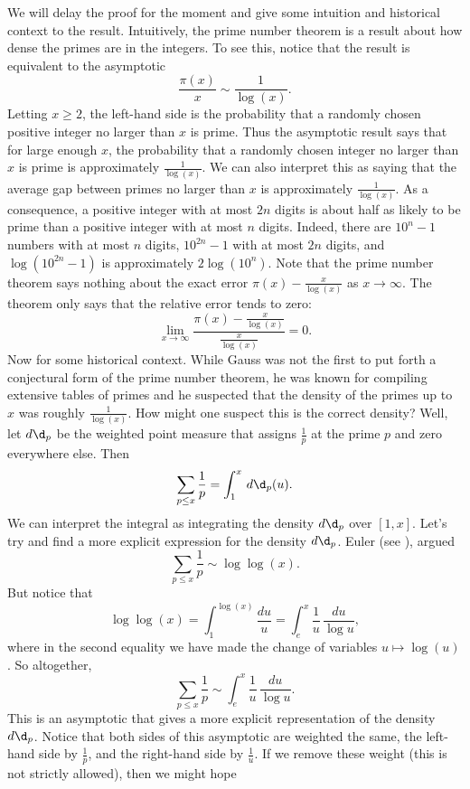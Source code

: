     We will delay the proof for the moment and give some intuition and historical context to the result. Intuitively, the prime number theorem is a result about how dense the primes are in the integers. To see this, notice that the result is equivalent to the asymptotic
    \[
      \frac{\pi(x)}{x} \sim \frac{1}{\log(x)}.
    \]
    Letting $x \ge 2$, the left-hand side is the probability that a randomly chosen positive integer no larger than $x$ is prime. Thus the asymptotic result says that for large enough $x$, the probability that a randomly chosen integer no larger than $x$ is prime is approximately $\frac{1}{\log(x)}$. We can also interpret this as saying that the average gap between primes no larger than $x$ is approximately $\frac{1}{\log(x)}$. As a consequence, a positive integer with at most $2n$ digits is about half as likely to be prime than a positive integer with at most $n$ digits. Indeed, there are $10^{n}-1$ numbers with at most $n$ digits, $10^{2n}-1$ with at most $2n$ digits, and $\log(10^{2n}-1)$ is approximately $2\log(10^{n})$. Note that the prime number theorem says nothing about the exact error $\pi(x)-\frac{x}{\log(x)}$ as $x \to \infty$. The theorem only says that the relative error tends to zero:
    \[
      \lim_{x \to \infty}\frac{\pi(x)-\frac{x}{\log(x)}}{\frac{x}{\log(x)}} = 0.
    \]
    Now for some historical context. While Gauss was not the first to put forth a conjectural form of the prime number theorem, he was known for compiling extensive tables of primes and he suspected that the density of the primes up to $x$ was roughly $\frac{1}{\log(x)}$. How might one suspect this is the correct density? Well, let $d\d_{p}$ be the weighted point measure that assigns $\frac{1}{p}$ at the prime $p$ and zero everywhere else. Then
    \[
      \sum_{p \le x}\frac{1}{p} = \int_{1}^{x}\,d\d_{p}(u).
    \]
    We can interpret the integral as integrating the density $d\d_{p}$ over $[1,x]$. Let's try and find a more explicit expression for the density $d\d_{p}$. Euler (see \cite{euler1744variae}), argued
    \[
      \sum_{p \le x}\frac{1}{p} \sim \log\log(x).
    \]
    But notice that
    \[
      \log\log(x) = \int_{1}^{\log(x)}\frac{du}{u} = \int_{e}^{x}\frac{1}{u}\,\frac{du}{\log{u}},
    \]
    where in the second equality we have made the change of variables $u \mapsto \log(u)$. So altogether,
    \[
      \sum_{p \le x}\frac{1}{p} \sim \int_{e}^{x}\frac{1}{u}\,\frac{du}{\log{u}}.
    \]
    This is an asymptotic that gives a more explicit representation of the density $d\d_{p}$. Notice that both sides of this asymptotic are weighted the same, the left-hand side by $\frac{1}{p}$, and the right-hand side by $\frac{1}{u}$. If we remove these weight (this is not strictly allowed), then we might hope
